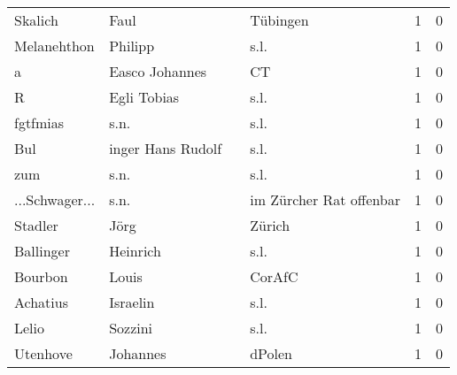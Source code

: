 \begin{tabular}{llllrr}
                  Skalich &                               Faul &             &                                    Tübingen &          1 &         0 \\
              Melanehthon &                            Philipp &             &                                        s.l. &          1 &         0 \\
                        a &                     Easco Johannes &             &                                          CT &          1 &         0 \\
                        R &                        Egli Tobias &             &                                        s.l. &          1 &         0 \\
                 fgtfmias &                               s.n. &             &                                        s.l. &          1 &         0 \\
                      Bul &                  inger Hans Rudolf &             &                                        s.l. &          1 &         0 \\
                      zum &                               s.n. &             &                                        s.l. &          1 &         0 \\
           ...Schwager... &                               s.n. &             &                     im Zürcher Rat offenbar &          1 &         0 \\
                  Stadler &                               Jörg &             &                                      Zürich &          1 &         0 \\
                Ballinger &                           Heinrich &             &                                        s.l. &          1 &         0 \\
                  Bourbon &                              Louis &             &                                      CorAfC &          1 &         0 \\
                 Achatius &                           Israelin &             &                                        s.l. &          1 &         0 \\
                    Lelio &                            Sozzini &             &                                        s.l. &          1 &         0 \\
                 Utenhove &                           Johannes &             &                                      dPolen &          1 &         0 \\

\end{tabular}
